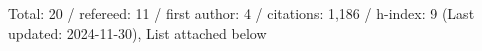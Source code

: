 Total: 20 / refereed: 11 / first author: 4 / citations: 1,186 / h-index: 9 (Last updated: 2024-11-30), List attached below